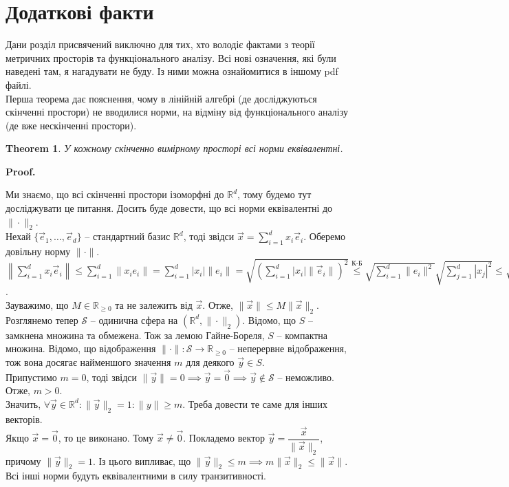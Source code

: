 \documentclass[a4paper, 10pt]{article}
\makeatletter
\theoremstyle{theoremdd}
\newtheorem{theorem}{Theorem}[subsection]
\renewenvironment{proof}[1][Proof.\\]{\par
\pushQED{\hfill \qed}%
\normalfont \topsep6\p@\@plus6\p@\relax
\trivlist
\item\relax
{\bfseries
#1\@addpunct{.}}\hspace\labelsep\ignorespaces
}{%
\popQED\endtrivlist\@endpefalse
}
\makeatother
\begin{document}
\newpage
\section{Додаткові факти}
Дани розділ присвячений виключно для тих, хто володіє фактами з теорії метричних просторів та функціонального аналізу. Всі нові означення, які були наведені там, я нагадувати не буду. Із ними можна ознайомитися в іншому pdf файлі.
\bigskip \\
Перша теорема дає пояснення, чому в лінійній алгебрі (де досліджуються скінченні простори) не вводилися норми, на відміну від функціонального аналізу (де вже нескінченні простори).
\begin{theorem}
У кожному скінченно вимірному просторі всі норми еквівалентні.
\end{theorem}

\begin{proof}
Ми знаємо, що всі скінченні простори ізоморфні до $\mathbb{R}^d$, тому будемо тут досліджувати це питання. Досить буде довести, що всі норми еквівалентні до $\| \cdot \|_2$.\\
Нехай $\{\vec{e}_1,\dots,\vec{e}_d\}$ -- стандартний базис $\mathbb{R}^d$, тоді звідси $\vec{x} = \displaystyle\sum_{i=1}^d x_i \vec{e}_i$. Оберемо довільну норму $\|\cdot \|$.\\
$\displaystyle\left\| \sum_{i=1}^d x_i \vec{e}_i
 \right\| \leq \sum_{i=1}^d \| x_i e_i \| = \sum_{i=1}^d |x_i| \|e_i\| = \sqrt{\left( \sum_{i=1}^d |x_i| \|\vec{e}_i\| \right)^2} \overset{\text{К-Б}}{\leq} \sqrt{\sum_{i=1}^d \|e_i\|^2} \sqrt{\sum_{j=1}^d |x_j|^2} \leq \sqrt{\sum_{i=1}^d \|e_i\|^2} \sqrt{\sum_{j=1}^\infty |x_j|^2} = \sqrt{\sum_{i=1}^d \|e_i\|^2} \|\vec{x}\|_2 = M \|\vec{x}\|_2$.\\
Зауважимо, що $M \in \mathbb{R}_{\geq 0}$ та не залежить від $\vec{x}$. Отже, $\|\vec{x}\| \leq M \|\vec{x}\|_2$.
\bigskip \\
Розглянемо тепер $\mathcal{S}$ -- одинична сфера на $(\mathbb{R}^d, \|\cdot \|_2)$. Відомо, що $S$ -- замкнена множина та обмежена. Тож за лемою Гайне-Бореля, $S$ -- компактна множина. Відомо, що відображення $\| \cdot \| \colon \mathcal{S} \to \mathbb{R}_{\geq 0}$ -- неперервне відображення, тож вона досягає найменшого значення $m$ для деякого $\vec{y} \in S$.\\
Припустимо $m = 0$, тоді звідси $\|\vec{y}\| = 0 \implies \vec{y} = \vec{0} \implies \vec{y} \notin \mathcal{S}$ -- неможливо. Отже, $m > 0$.\\
Значить, $\forall \vec{y} \in \mathbb{R}^d: \|\vec{y}\|_2 = 1: \|y\| \geq m$. Треба довести те саме для інших векторів.\\
Якщо $\vec{x} = \vec{0}$, то це виконано. Тому $\vec{x} \neq \vec{0}$. Покладемо вектор $\vec{y} = \dfrac{\vec{x}}{\| \vec{x} \|_2}$, причому $\|\vec{y}\|_2 = 1$. Із цього випливає, що $\| \vec{y} \|_2 \leq m \implies m \|\vec{x}\|_2 \leq \|\vec{x}\|$.
\bigskip \\
Всі інші норми будуть еквівалентними в силу транзитивності.
\end{proof}
\end{document}
